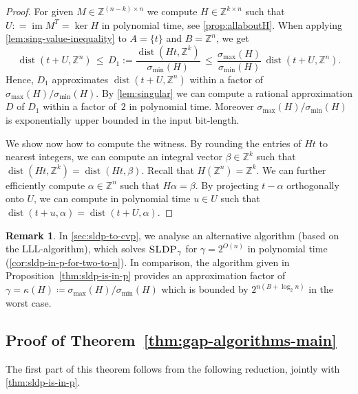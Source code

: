 \documentclass[10pt,a4paper]{article}
\theoremstyle{definition}
\newtheorem{remark}[theorem]{Remark}
\DeclareMathOperator{\dist}{dist}
\DeclareMathOperator{\ran}{im}
\newcommand{\ZZ}{\mathbb{Z}}
\numberwithin{equation}{section}
\begin{document}
\begin{proof}
For given $M\in\ZZ^{(n-k)\times n}$ we compute
$H\in\ZZ^{k\times n}$ such that $U : =\ran M^T =\ker H$
in polynomial time,
see \cref{prop:allaboutH}.
When applying \cref{lem:sing-value-inequality}
to $A =\{t\}$ and $B =\ZZ^n$, we get
\begin{equation}
\label{eq:nice-ineq}
\dist(t+U,\ZZ^n)\, \leq\, D_1 := \frac{\dist(Ht, \ZZ^k)}{\sigma_{\min}(H)}\,
 \leq\, \frac{\sigma_{\max}(H)}{\sigma_{\min}(H)} \, \dist(t+U,\ZZ^n) .
\end{equation}
Hence, $D_1$
approximates $\dist(t+U,\ZZ^n)$ within a factor of
$\sigma_{\max}(H)/\sigma_{\min}(H)$.
By \cref{lem:singular} we can compute a rational approximation $D$ of $D_1$
within a factor of~$2$ in polynomial time.
Moreover $\sigma_{\max}(H)/\sigma_{\min}(H)$
is exponentially upper bounded in the input bit-length.

We show now how to compute the witness.
By rounding the entries of $Ht$ to nearest integers, we can compute an integral vector
$\beta\in\ZZ^k$ such that $\dist(Ht,\ZZ^k)=\dist(Ht,\beta)$.
Recall that $H(\ZZ^n) = \ZZ^k$.
We can further efficiently compute $\alpha\in\ZZ^n$ such that $H\alpha=\beta$.
By projecting $t-\alpha$ orthogonally onto $U$,
we can compute in polynomial time $u\in U$ such that
$\dist(t+u,\alpha)=\dist(t+U,\alpha)$.
\end{proof}

\begin{remark}
In \cref{sec:sldp-to-cvp}, we analyse an alternative algorithm
(based on the LLL-algorithm),
which solves $\textsc{SLDP}_\gamma$ for $\gamma =2^{O(n)}$
in polynomial time (\cref{cor:sldp-in-p-for-two-to-n}). In comparison, the algorithm given in Proposition~\ref{thm:sldp-is-in-p} provides an approximation factor of $\gamma=\kappa(H)\coloneqq\sigma_{\max}(H)/\sigma_{\min}(H)$ which is bounded by $2^{n(B+\log_2 n)}$ in the worst case.
\end{remark}

\subsection{Proof of Theorem~\ref{thm:gap-algorithms-main}}
\label{se:pf-gap-algs}
The first part of this theorem follows from
the following reduction, jointly with \cref{thm:sldp-is-in-p}.
\end{document}

